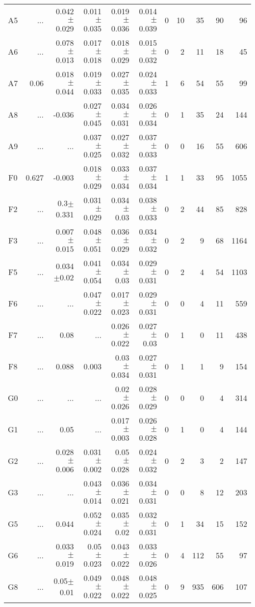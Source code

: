 \begin{table}[t]
\begin{center}
\begin{tabular}{c|rrrrr|rrrrr}
A5	&	 ...	&	0.042$\pm$0.029	&	0.011$\pm$0.035	&	0.019$\pm$0.036	&	0.014$\pm$0.039	&	0	&	10	&	35	&	90	&	96	\\
A6	&	 ...	&	0.078$\pm$0.013	&	0.017$\pm$0.018	&	0.018$\pm$0.029	&	0.015$\pm$0.032	&	0	&	2	&	11	&	18	&	45	\\
A7	&	0.06	&	0.018$\pm$0.044	&	0.019$\pm$0.033	&	0.027$\pm$0.035	&	0.024$\pm$0.033	&	1	&	6	&	54	&	55	&	99	\\
A8	&	 ...	&	-0.036	&	0.027$\pm$0.045	&	0.034$\pm$0.031	&	0.026$\pm$0.034	&	0	&	1	&	35	&	24	&	144	\\
A9	&	 ...	&	 ...	&	0.037$\pm$0.025	&	0.027$\pm$0.032	&	0.037$\pm$0.033	&	0	&	0	&	16	&	55	&	606	\\
F0	&	0.627	&	-0.003	&	0.018$\pm$0.029	&	0.033$\pm$0.034	&	0.037$\pm$0.034	&	1	&	1	&	33	&	95	&	1055	\\
F2	&	 ...	&	0.3$\pm$0.331	&	0.031$\pm$0.029	&	0.034$\pm$0.03	&	0.038$\pm$0.033	&	0	&	2	&	44	&	85	&	828	\\
F3	&	 ...	&	0.007$\pm$0.015	&	0.048$\pm$0.051	&	0.036$\pm$0.029	&	0.034$\pm$0.032	&	0	&	2	&	9	&	68	&	1164	\\
F5	&	 ...	&	0.034$\pm$0.02	&	0.041$\pm$0.054	&	0.034$\pm$0.03	&	0.029$\pm$0.031	&	0	&	2	&	4	&	54	&	1103	\\
F6	&	 ...	&	 ...	&	0.047$\pm$0.022	&	0.017$\pm$0.023	&	0.029$\pm$0.031	&	0	&	0	&	4	&	11	&	559	\\
F7	&	 ...	&	0.08	&	 ...	&	0.026$\pm$0.022	&	0.027$\pm$0.03	&	0	&	1	&	0	&	11	&	438	\\
F8	&	 ...	&	0.088	&	0.003	&	0.03$\pm$0.034	&	0.027$\pm$0.031	&	0	&	1	&	1	&	9	&	154	\\
G0	&	 ...	&	 ...	&	 ...	&	0.02$\pm$0.026	&	0.028$\pm$0.029	&	0	&	0	&	0	&	4	&	314	\\
G1	&	 ...	&	0.05	&	 ...	&	0.017$\pm$0.003	&	0.026$\pm$0.028	&	0	&	1	&	0	&	4	&	144	\\
G2	&	 ...	&	0.028$\pm$0.006	&	0.031$\pm$0.002	&	0.05$\pm$0.028	&	0.024$\pm$0.032	&	0	&	2	&	3	&	2	&	147	\\
G3	&	 ...	&	 ...	&	0.043$\pm$0.014	&	0.036$\pm$0.021	&	0.034$\pm$0.031	&	0	&	0	&	8	&	12	&	203	\\
G5	&	 ...	&	0.044	&	0.052$\pm$0.024	&	0.035$\pm$0.02	&	0.032$\pm$0.031	&	0	&	1	&	34	&	15	&	152	\\
G6	&	 ...	&	0.033$\pm$0.019	&	0.05$\pm$0.023	&	0.043$\pm$0.022	&	0.033$\pm$0.026	&	0	&	4	&	112	&	55	&	97	\\
G8	&	 ...	&	0.05$\pm$0.01	&	0.049$\pm$0.022	&	0.048$\pm$0.022	&	0.048$\pm$0.025	&	0	&	9	&	935	&	606	&	107	\\

\end{tabular}
\end{center}
\end{table}
